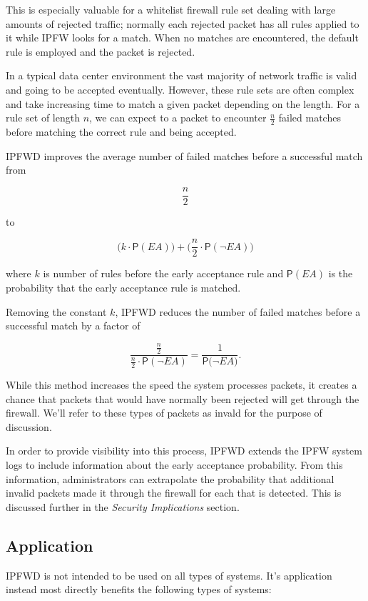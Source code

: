 \documentclass[journal]{IEEEtran}
\begin{document}
This is especially valuable for a whitelist firewall rule set dealing with
large amounts of rejected traffic; normally each rejected packet has all rules
applied to it while IPFW looks for a match.  When no matches are encountered,
the default rule is employed and the packet is rejected. 

In a typical data center environment the vast majority of network traffic is
valid and going to be accepted eventually. However, these rule sets are often
complex and take increasing time to match a given packet depending on the
length. For a rule set of length $n$, we can expect to a packet to encounter
$\frac{n}{2}$ failed matches before matching the correct rule and being accepted.

IPFWD improves the average number of failed matches before a successful match
from

\[
\frac{n}{2}
\]

to

\[
\Big(k \cdot \mathsf{P}(\textit{EA})\Big) + 
\Big(\frac{n}{2} \cdot \mathsf{P}(\neg{\textit{EA}})\Big) 
\]

where $k$ is number of rules before the early acceptance rule and
$\mathsf{P}(\textit{EA})$ is the probability that the early acceptance rule is
matched.

Removing the constant $k$, IPFWD reduces the number of failed matches before a
successful match by a factor of

\[
\frac
    {\frac{n}{2}}
    {\frac{n}{2} \cdot \mathsf{P}(\neg{\textit{EA}})} 
= \frac{1}{\mathsf{P}(\neg{\textit{EA})}}.
\]

While this method increases the speed the system processes packets, it
creates a chance that packets that would have normally been rejected will get
through the firewall. We'll refer to these types of packets as invald for the purpose of discussion.

In order to provide visibility into this process, IPFWD extends the IPFW system logs to include information
about the early acceptance probability. From this information, administrators
can extrapolate the probability that additional invalid packets made it through
the firewall for each that is detected. This is discussed further in the
\textit{Security Implications} section.

\subsection{Application}
IPFWD is not intended to be used on all types of systems. It's application
instead most directly benefits the following types of systems:
\end{document}
